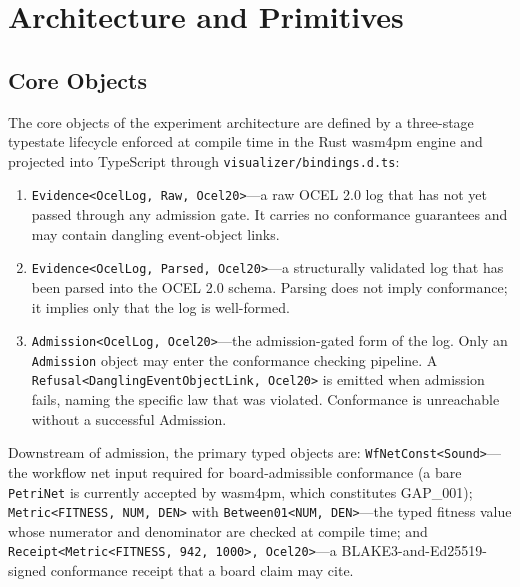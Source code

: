 
\section{Architecture and Primitives}
\label{sec:experiments-core-arch}

\subsection{Core Objects}
\label{sec:experiments-core-arch-objects}

The core objects of the experiment architecture are defined by a three-stage typestate
lifecycle enforced at compile time in the Rust wasm4pm engine and projected into
TypeScript through \texttt{visualizer/bindings.d.ts}:

\begin{enumerate}
  \item \texttt{Evidence<OcelLog, Raw, Ocel20>}---a raw OCEL 2.0 log that has not yet
    passed through any admission gate. It carries no conformance guarantees and may
    contain dangling event-object links.
  \item \texttt{Evidence<OcelLog, Parsed, Ocel20>}---a structurally validated log that
    has been parsed into the OCEL 2.0 schema. Parsing does not imply conformance; it
    implies only that the log is well-formed.
  \item \texttt{Admission<OcelLog, Ocel20>}---the admission-gated form of the log.
    Only an \texttt{Admission} object may enter the conformance checking pipeline.
    A \texttt{Refusal<DanglingEventObjectLink, Ocel20>} is emitted when admission
    fails, naming the specific law that was violated. Conformance is unreachable
    without a successful Admission.
\end{enumerate}

Downstream of admission, the primary typed objects are:
\texttt{WfNetConst<Sound>}---the workflow net input required for board-admissible
conformance (a bare \texttt{PetriNet} is currently accepted by wasm4pm, which
constitutes GAP\_001);
\texttt{Metric<FITNESS, NUM, DEN>} with \texttt{Between01<NUM, DEN>}---the typed
fitness value whose numerator and denominator are checked at compile time;
and \texttt{Receipt<Metric<FITNESS, 942, 1000>, Ocel20>}---a BLAKE3-and-Ed25519-signed
conformance receipt that a board claim may cite.

